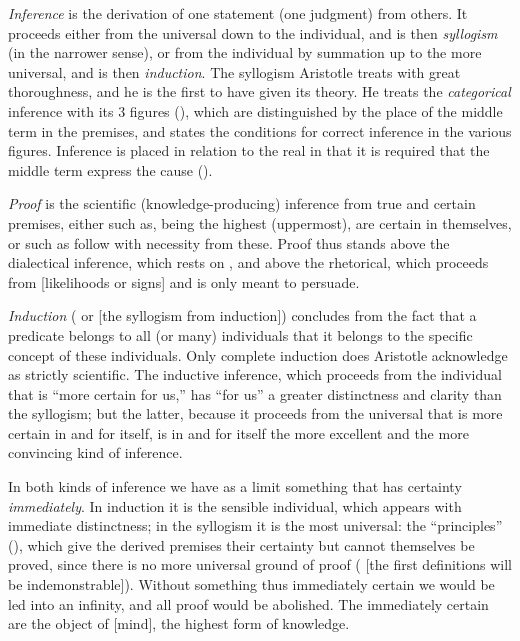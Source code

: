 \emph{Inference} is the derivation of one statement (one judgment) from
others. It proceeds either from the universal down to the individual,
and is then \emph{syllogism} (in the narrower sense), or from the
individual by summation up to the more universal, and is then
\emph{induction}. The syllogism Aristotle treats with great
thoroughness, and he is the first to have given its theory. He treats
the \emph{categorical} inference with its 3 figures (),
which are distinguished by the place of the middle term in the
premises, and states the conditions for correct inference in the
various figures. Inference is placed in relation to the real in that it
is required that the middle term express the cause ().

\emph{Proof} is the scientific (knowledge-producing) inference
from true and certain premises, either such as, being the highest
(uppermost), are certain in themselves,
or such as follow with necessity from these. Proof thus stands above
the dialectical inference, which rests on ,
and above the rhetorical, which proceeds from 
[likelihoods or signs] and is only meant to persuade.

\emph{Induction} ( or  [the
syllogism from induction]) concludes from the fact that a predicate
belongs to all (or many) individuals that it belongs to the specific
concept of these individuals. Only complete induction does Aristotle
acknowledge as strictly scientific. The inductive inference, which
proceeds from the individual that is ``more certain for us,'' has ``for
us'' a greater distinctness and clarity than the syllogism; but the
latter, because it proceeds from the universal that is more certain in
and for itself, is in and for itself the more excellent and the more
convincing kind of inference.

In both kinds of inference we have as a limit something that has
certainty \emph{immediately}. In induction it is the sensible
individual, which appears with immediate distinctness; in the
syllogism it is the most universal: the ``principles'' (),
which give the derived premises their certainty but cannot themselves
be proved, since there is no more universal ground of proof ( [the first definitions will be
indemonstrable]). Without something thus immediately certain we would
be led into an infinity, and all proof would be abolished. The
immediately certain  are the object of  [mind], the
highest form of knowledge.

